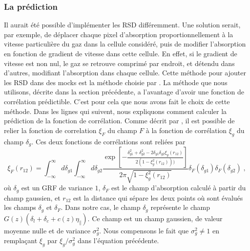 \documentclass[11pt, twoside, a4paper, openright]{report}
\begin{document}
\subsubsection{La prédiction}
Il aurait été possible d'implémenter les RSD différemment. Une solution serait, par exemple, de déplacer chaque pixel d'absorption proportionnellement à la vitesse particulière du gaz dans la cellule considéré, puis de modifier l'absorption en fonction de gradient de vitesse dans cette cellule. En effet, si le gradient de vitesse est non nul, le gaz se retrouve comprimé par endroit, et détendu dans d'autres, modifiant l'absorption dans chaque cellule. Cette méthode pour ajouter les RSD dans des mocks \lya{} est la méthode choisie par \citet{Farr2019}.
La méthode que nous utilisons, décrite dans la section précédente, a l'avantage d'avoir une fonction de corrélation prédictible. C'est pour cela que nous avons fait le choix de cette méthode. Dans les lignes qui suivent, nous expliquons comment calculer la prédiction de la fonction de corrélation. Comme décrit par \citet{Font-Ribera2012}, il est possible de relier la fonction de correlation $\xi_F$ du champ $F$ à la fonction de corrélation $\xi_g$ du champ $\delta_g$. Ces deux fonctions de corrélations sont reliées par
\begin{equation}
  \label{eq:xig2xif}
  \xi_F(r_{12}) = \int_{- \infty}^{\infty} d\delta_{g1} \int_{- \infty}^{\infty} d\delta_{g2}
  \frac{
    \exp\left[-
      \frac{
        \delta_{g1}^2 + \delta_{g2}^2 - 2 \delta_{g1} \delta_{g2} \xi_g(r_{12})
      }{
        2 ( 1 - \xi_g^2(r_{12})))
      }\right]
  }{
    2 \pi \sqrt{1 - \xi_g^2(r_{12})}
  }
  \delta_F(\delta_{g1})\delta_F(\delta_{g2})
  \; ,
\end{equation}
où $\delta_g$ est un GRF de variance $1$, $\delta_F$ est le champ d'absorption calculé à partir du champ gaussien, et $r_{12}$ est la distance qui sépare les deux points où sont évalués les champs $\delta_g$ et $\delta_F$. Dans notre cas, le champ $\delta_g$ représente le champ $G(z)(\delta_l + \delta_c + c(z)\eta_{\parallel})$. Ce champ est un champ gaussien, de valeur moyenne nulle et de variance $\sigma_g^2$. Nous compensons le fait que $\sigma_g^2 \neq 1$ en remplaçant $\xi_g$ par $\xi_g / \sigma_g^2$ dans l'équation précédente. %
\end{document}
